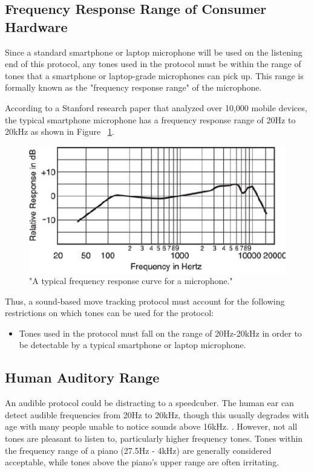 \subsection{Frequency Response Range of Consumer Hardware}
\label{subsec:frequency-response-range}
Since a standard smartphone or laptop microphone will be used on the listening end of this protocol, any tones used in the protocol must be within the range of tones that a smartphone or laptop-grade microphones can pick up.
This range is formally known as the "frequency response range" of the microphone.

According to a Stanford research paper \cite{typical-mic-range} that analyzed over 10,000 mobile devices, the typical smartphone microphone has a frequency response range of 20Hz to 20kHz as shown in Figure ~\ref{fig:freq-res-range}.

\begin{figure}[h]
    \centering
    \includegraphics[width=.50\linewidth]{Figures/4 Protocol Design/Frequency Response Range/typical-smartphone-response-range.png}
    \decoRule
    \caption{"A typical frequency response curve for a microphone." \cite{typical-mic-range}}
    \label{fig:freq-res-range}
\end{figure}

Thus, a sound-based move tracking protocol must account for the following restrictions on which tones can be used for the protocol:
\begin{itemize}
    \item Tones used in the protocol must fall on the range of 20Hz-20kHz in order to be detectable by a typical smartphone or laptop microphone.
\end{itemize}

\subsection{Human Auditory Range}
\label{subsec:human-auditory-range}
An audible protocol could be distracting to a speedcuber. 
The human ear can detect audible frequencies from 20Hz to 20kHz, though this usually degrades with age with many people unable to notice sounds above 16kHz. \cite{audible-range}.
However, not all tones are pleasant to listen to, particularly higher frequency tones.
Tones within the frequency range of a piano (27.5Hz - 4kHz) are generally considered acceptable, while tones above the piano's upper range are often irritating. \cite{piano-range}

